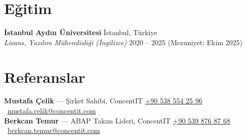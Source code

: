 \documentclass[10pt,a4paper]{extarticle}
\begin{document}
\section{Eğitim}
\textbf{İstanbul Aydın Üniversitesi} \hfill İstanbul, Türkiye\\
\textit{Lisans, Yazılım Mühendisliği (İngilizce)} \hfill 2020 -- 2025 (Mezuniyet: Ekim 2025)
\section{Referanslar}
\textbf{Mustafa Çelik} --- Şirket Sahibi, ConcentIT \hfill \href{tel:+905385542596}{+90 538 554 25 96} \textbullet\ \href{mailto:mustafa.celik@concentit.com}{mustafa.celik@concentit.com}\\
\textbf{Berkcan Temur} --- ABAP Takım Lideri, ConcentIT \hfill \href{tel:+905398768768}{+90 539 876 87 68} \textbullet\ \href{mailto:berkcan.temur@concentit.com}{berkcan.temur@concentit.com}
\end{document}
